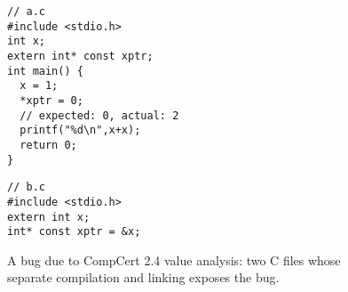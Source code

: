  %

\begin{figure}
\begin{minipage}[t]{0.57\columnwidth}
\begin{verbatim}
// a.c             
#include <stdio.h> 
int x;
extern int* const xptr;
int main() {
  x = 1;
  *xptr = 0;
  // expected: 0, actual: 2
  printf("%d\n",x+x);
  return 0;
}
\end{verbatim}
\end{minipage}\begin{minipage}[t]{0.43\columnwidth}
\begin{verbatim}
// b.c
#include <stdio.h>          
extern int x;
int* const xptr = &x;
\end{verbatim}
\end{minipage}
\caption{A bug due to CompCert 2.4 value analysis: two C files whose separate compilation and linking exposes the bug.}
\label{fig:sepcomp:constprop-bug}
\end{figure}


